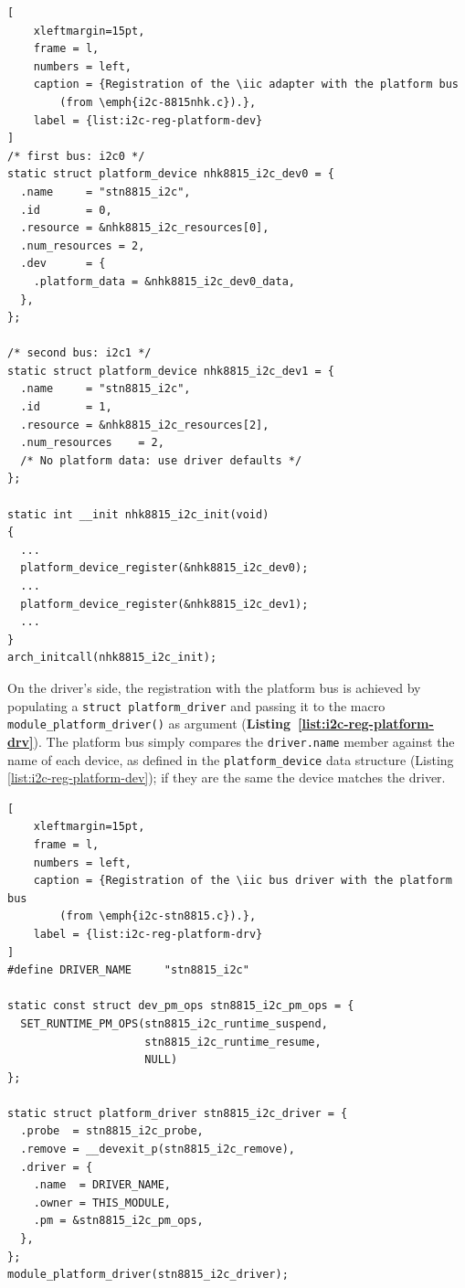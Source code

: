 \documentclass[a4paper,10pt]{article}
\newcommand{\iic}{I\textsuperscript{2}C }
\newcommand{\keyword}[1]{\texttt{#1}}
\newcommand{\refl}[1]{\textbf{Listing~\ref{#1}}}
\begin{document}
\begin{multicols}{2}
\begin{lstlisting}[
	xleftmargin=15pt,
	frame = l,
	numbers = left,
	caption = {Registration of the \iic adapter with the platform bus
		(from \emph{i2c-8815nhk.c}).},
	label = {list:i2c-reg-platform-dev}
]
/* first bus: i2c0 */
static struct platform_device nhk8815_i2c_dev0 = {
  .name		= "stn8815_i2c",
  .id		= 0,
  .resource	= &nhk8815_i2c_resources[0],
  .num_resources = 2,
  .dev		= {
    .platform_data = &nhk8815_i2c_dev0_data,
  },
};

/* second bus: i2c1 */
static struct platform_device nhk8815_i2c_dev1 = {
  .name		= "stn8815_i2c",
  .id		= 1,
  .resource	= &nhk8815_i2c_resources[2],
  .num_resources	= 2,
  /* No platform data: use driver defaults */
};

static int __init nhk8815_i2c_init(void)
{
  ...
  platform_device_register(&nhk8815_i2c_dev0);
  ...
  platform_device_register(&nhk8815_i2c_dev1);
  ...
}
arch_initcall(nhk8815_i2c_init);
\end{lstlisting}

On the driver's side, the registration with the platform bus is achieved by
populating a \keyword{struct  platform\_driver} and passing it to the
macro \keyword{module\_platform\_driver()} as argument
(\refl{list:i2c-reg-platform-drv}).
The platform bus simply compares the \keyword{driver.name} member against
the name of each device, as defined in the \keyword{platform\_device} data
structure (Listing \ref{list:i2c-reg-platform-dev}); if they are the same
the device matches the driver.

\begin{lstlisting}[
	xleftmargin=15pt,
	frame = l,
	numbers = left,
	caption = {Registration of the \iic bus driver with the platform bus
		(from \emph{i2c-stn8815.c}).},
	label = {list:i2c-reg-platform-drv}
]
#define DRIVER_NAME 	"stn8815_i2c"

static const struct dev_pm_ops stn8815_i2c_pm_ops = {
  SET_RUNTIME_PM_OPS(stn8815_i2c_runtime_suspend,
                     stn8815_i2c_runtime_resume,
                     NULL)
};

static struct platform_driver stn8815_i2c_driver = {
  .probe  = stn8815_i2c_probe,
  .remove = __devexit_p(stn8815_i2c_remove),
  .driver = {
    .name  = DRIVER_NAME,
    .owner = THIS_MODULE,
    .pm	= &stn8815_i2c_pm_ops,
  },
};
module_platform_driver(stn8815_i2c_driver);
\end{lstlisting}


\end{multicols}
\end{document}
